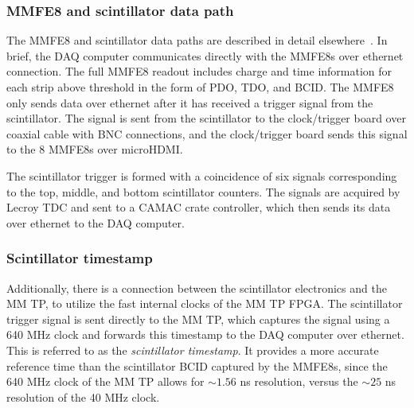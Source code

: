\subsubsection{MMFE8 and scintillator data path}
\label{sec:exp-mmfe}

The MMFE8 and scintillator data paths are described in detail elsewhere~\cite{noisy,noiseless}. In brief, the DAQ computer communicates directly with the MMFE8s over ethernet connection. The full MMFE8 readout includes charge and time information for each strip above threshold in the form of PDO, TDO, and BCID. The MMFE8 only sends data over ethernet after it has received a trigger signal from the scintillator. The signal is sent from the scintillator to the clock/trigger board over coaxial cable with BNC connections, and the clock/trigger board sends this signal to the 8 MMFE8s over microHDMI.

The scintillator trigger is formed with a coincidence of six signals corresponding to the top, middle, and bottom scintillator counters. The signals are acquired by Lecroy TDC and sent to a CAMAC crate controller, which then sends its data over ethernet to the DAQ computer.

\subsubsection{Scintillator timestamp}
\label{sec:exp-scitime}

Additionally, there is a connection between the scintillator electronics and the MM TP, to utilize the fast internal clocks of the MM TP FPGA. The scintillator trigger signal is sent directly to the MM TP, which captures the signal using a 640 MHz clock and forwards this timestamp to the DAQ computer over ethernet. This is referred to as the \textit{scintillator timestamp}. It provides a more accurate reference time than the scintillator BCID captured by the MMFE8s, since the 640 MHz clock of the MM TP allows for $\sim\!1.56$ ns resolution, versus the $\sim\!25$ ns resolution of the 40 MHz clock.


